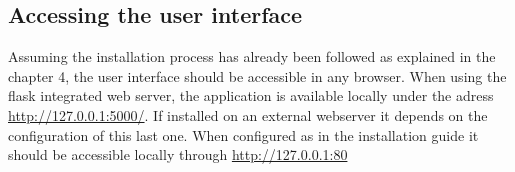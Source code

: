 \subsection{Accessing the user interface}
Assuming the installation process has already been followed as explained in the chapter 4, the user interface should be accessible in any browser. When using the flask integrated web server, the application is available locally under the adress \url{http://127.0.0.1:5000/}. If installed on an external webserver it depends on the configuration of this last one. When configured as in the installation guide it should be accessible locally through \url{http://127.0.0.1:80}

